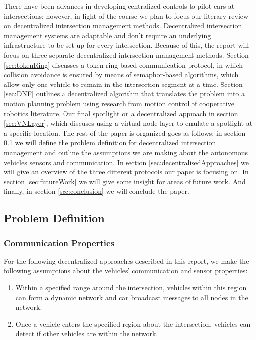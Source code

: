 \documentclass[12pt]{article}
\begin{document}
There have been advances in developing centralized controls to pilot cars at intersections; however, in light of the course we plan to focus our literary review on decentralized intersection management methods.  Decentralized intersection management systems are adaptable and don't require an underlying infrastructure to be set up for every intersection.  %
Because of this, the report will focus on three separate decentralized intersection management methods. 
Section \ref{sec:tokenRing}  discusses a token-ring-based communication protocol, in which  collision avoidance is ensured by means of semaphor-based algorithms, which allow only one vehicle to remain in the intersection segment at a time.  Section \ref{sec:DNF} outlines a decentralized algorithm that translates the problem into a motion planning problem using research from motion control of cooperative robotics literature.  Our final spotlight on a decentralized approach in section \ref{sec:VNLayer}, which discuses using a virtual node layer to emulate a  spotlight at a specific location.  
The rest of the  paper is organized  goes as follows: in section \ref{sec:problemDefinition} we will define the problem definition for decentralized intersection management and outline the assumptions we are making about the autonomous vehicles sensors and communication.  In section \ref{sec:decentralizedApproaches} we will give an overview of the three different protocols our paper is focusing on.  In section \ref{sec:futureWork} we will give some insight for areas of future work.  And finally, in section \ref{sec:conclusion} we will conclude the paper.

\subsection{Problem Definition}
\label{sec:problemDefinition}
\subsubsection{Communication Properties}
For the following decentralized approaches described in this report, we make the following assumptions about the vehicles' communication and sensor properties:
\begin{enumerate}
\item Within a specified range around the intersection, vehicles within this region can form a dynamic network and can broadcast messages to all nodes in the network.
\item
Once a vehicle enters the specified region about the intersection, vehicles can detect if other vehicles are within the network.  
\end{enumerate}
\end{document}
